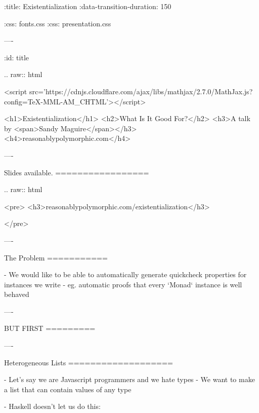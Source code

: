 :title: Existentialization
:data-transition-duration: 150

:css: fonts.css
:css: presentation.css


\newenvironment{table}{.. raw:: html

  <table>}{
  </table>
}

\newenvironment{hs}{.. code:: haskell
}{}
\newenvironment{raw}{.. raw:: html

  <pre>}{
  </pre>
}
\newenvironment{error}{.. raw:: html

  <pre class="error">}{    </pre>
}
\newenvironment{custom}{.. raw:: html

  <pre class="highlight code haskell">}{
  </pre>
}
\newcommand{\$}{\begin{verbatim}$\end{verbatim}}
\newcommand{\todo}[2]{#2}
\newcommand{\note}[1]{<span class="new">#1</span>}
\newcommand{\wat}[1]{<span class="wat">#1</span>}

----

:id: title

.. raw:: html

  <script src='https://cdnjs.cloudflare.com/ajax/libs/mathjax/2.7.0/MathJax.js?config=TeX-MML-AM_CHTML'></script>

  <h1>Existentialization</h1>
  <h2>What Is It Good For?</h2>
  <h3>A talk by <span>Sandy Maguire</span></h3>
  <h4>reasonablypolymorphic.com</h4>

----

Slides available.
=================

\begin{raw}
  <h3>reasonablypolymorphic.com/existentialization</h3>
\end{raw}

----

The Problem
===========

- We would like to be able to automatically generate quickcheck properties for instances we write
- eg. automatic proofs that every `Monad` instance is well behaved

----

BUT FIRST
=========

----

Heterogeneous Lists
===================

- Let's say we are Javascript programmers and we hate types
- We want to make a list that can contain values of any type

- Haskell doesn't let us do this:


